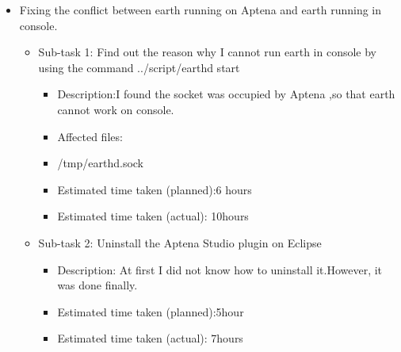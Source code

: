  \begin{itemize}
\item Fixing the conflict between earth running on Aptena and earth running in console.
	     \begin{itemize}
	         \item Sub-task 1: Find out the reason why I cannot run earth in console by using the command 
                  ../script/earthd start
	            \begin{itemize}
	              \item Description:I found the socket was occupied by Aptena ,so that earth cannot work on        console. 		
			   	       \item Affected files:\\
                                      \item /tmp/earthd.sock\\
				      \item Estimated time taken (planned):6 hours
				      \item Estimated time taken (actual): 10hours
	                  \end{itemize}
                          \end{itemize}
               \begin{itemize}
	         \item Sub-task 2: Uninstall the Aptena Studio plugin on Eclipse
	            \begin{itemize}
				  \item Description: At first I did not know how to uninstall it.However, it                        was done finally.
			          \item Estimated time taken (planned):5hour
				  \item Estimated time taken (actual): 7hours
                   \end{itemize}
                   \end{itemize}
  \end{itemize}

